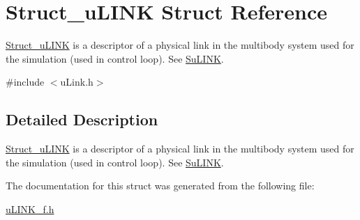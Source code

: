 \hypertarget{struct_struct__u_l_i_n_k}{\section{Struct\-\_\-u\-L\-I\-N\-K Struct Reference}
\label{struct_struct__u_l_i_n_k}
}


\hyperlink{struct_struct__u_l_i_n_k}{Struct\-\_\-u\-L\-I\-N\-K} is a descriptor of a physical link in the multibody system used for the simulation (used in control loop). See \hyperlink{struct_su_l_i_n_k}{Su\-L\-I\-N\-K}.  




{\ttfamily \#include $<$u\-Link.\-h$>$}



\subsection{Detailed Description}
\hyperlink{struct_struct__u_l_i_n_k}{Struct\-\_\-u\-L\-I\-N\-K} is a descriptor of a physical link in the multibody system used for the simulation (used in control loop). See \hyperlink{struct_su_l_i_n_k}{Su\-L\-I\-N\-K}. 

The documentation for this struct was generated from the following file\-:\begin{DoxyCompactItemize}
\item 
\hyperlink{u_l_i_n_k__f_8h}{u\-L\-I\-N\-K\-\_\-f.\-h}\end{DoxyCompactItemize}
